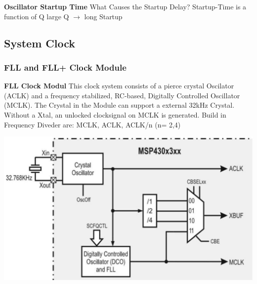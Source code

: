 \textbf{Oscillator Startup Time }\newline
What Causes the Startup Delay?\newline
Startup-Time is a function of Q \qquad large Q $ \rightarrow $ long Startup
\clearpage

\subsection{System Clock }
\subsubsection{FLL and FLL+ Clock Module }
\begin{minipage}{0.55\linewidth}
    \textbf{FLL Clock Modul}\newline
    This clock system consists of a pierce crystal Oscilator (ACLK) and a frequency stabilized, RC-based, Digitally Controlled Oscillator (MCLK).\newline
    The Crystal in the Module can support a external 32kHz Crystal.
    Without a Xtal, an unlocked clocksignal on MCLK is generated.\newline\newline
    Build in Frequency Diveder are:\newline
    MCLK, ACLK, ACLK/n (n= 2,4)
\end{minipage}
\begin{minipage}{0.45\linewidth}
    \includegraphics[width=0.8\linewidth]{images/FLLClock} 
\end{minipage}

